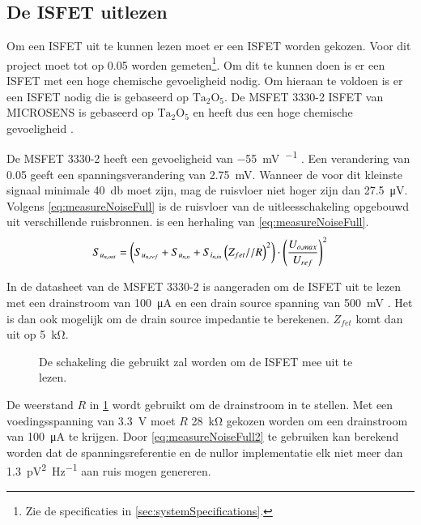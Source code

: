 \subsection{De ISFET uitlezen}
Om een ISFET uit te kunnen lezen moet er een ISFET worden gekozen. Voor dit project moet \si{\pH} tot op \qty{0.05}{\pH} worden gemeten\footnote{Zie de specificaties in \cref{sec:systemSpecifications}.}. Om dit te kunnen doen is er een ISFET met een hoge chemische gevoeligheid nodig. Om hieraan te voldoen is er een ISFET nodig die is gebaseerd op $\mathrm{Ta_2O_5}$. De MSFET 3330-2 ISFET van MICROSENS is gebaseerd op $\mathrm{Ta_2O_5}$ en heeft dus een hoge chemische gevoeligheid \cite{bergveld2003thirtyYearsISFET,bergveld1985impactOfMosfetBasedSensors,isfet}.

De MSFET 3330-2 heeft een gevoeligheid van \qty{-55}{\milli\volt\pH^{-1}} \cite{isfet}. Een verandering van \qty{0.05}{\pH} geeft een spanningsverandering van \qty{2.75}{\milli\volt}. Wanneer de \SNR voor dit kleinste signaal minimale \qty{40}{\decibel} moet zijn, mag de ruisvloer niet hoger zijn dan \qty{27.5}{\micro\volt}. Volgens \cref{eq:measureNoiseFull} is de ruisvloer van de uitleesschakeling opgebouwd uit verschillende ruisbronnen.  is een herhaling van \cref{eq:measureNoiseFull}.
\begin{equation}\label{eq:measureNoiseFull2}
    S_{u_{{n,out}}} = \left(S_{u_{{n,ref}}} + S_{u_{{n,n}}} + S_{i_{{n,in}}}\left(Z_{fet} // R\right)^2\right) \cdot \left(\frac{U_{o,max}}{U_{ref}}\right)^2
    \tagaddtext{[\si{\volt\squared\per\hertz}]}
\end{equation}

In de datasheet van de MSFET 3330-2 is aangeraden om de ISFET uit te lezen met een drainstroom van \qty{100}{\micro\ampere} en een drain source spanning van \qty{500}{\milli\volt} \cite{isfet}. Het is dan ook mogelijk om de drain source impedantie te berekenen. $Z_{fet}$ komt dan uit op \qty{5}{\kilo\ohm}.
\begin{figure}[!htbp]
    \centering
    \def\svgwidth{0.4\textwidth}
    
    \caption{De schakeling die gebruikt zal worden om de ISFET mee uit te lezen.}
    \label{fig:measureResistorImplementatie}
\end{figure}
De weerstand $R$ in \cref{fig:measureResistorImplementatie} wordt gebruikt om de drainstroom in te stellen. Met een voedingsspanning van \qty{3.3}{\volt} moet $R$ \qty{28}{\kilo\ohm} gekozen worden om een drainstroom van \qty{100}{\micro\ampere} te krijgen. Door \cref{eq:measureNoiseFull2} te gebruiken kan berekend worden dat de spanningsreferentie en de nullor implementatie elk niet meer dan \qty{1.3}{\pico\volt^2\hertz^{-1}} aan ruis mogen genereren.

